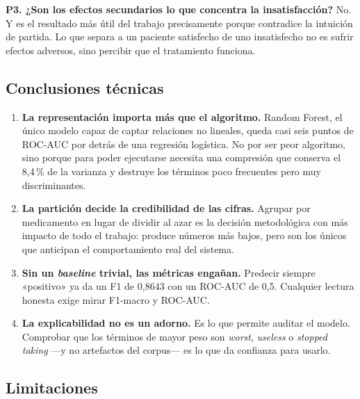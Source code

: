 \documentclass[11pt,a4paper]{article}
\begin{document}
\textbf{P3. ¿Son los efectos secundarios lo que concentra la insatisfacción?}
No. Y es el resultado más útil del trabajo precisamente porque contradice la
intuición de partida. Lo que separa a un paciente satisfecho de uno insatisfecho
no es sufrir efectos adversos, sino percibir que el tratamiento funciona.

\subsection{Conclusiones técnicas}

\begin{enumerate}[leftmargin=*]
  \item \textbf{La representación importa más que el algoritmo.} Random Forest,
        el único modelo capaz de captar relaciones no lineales, queda casi seis
        puntos de ROC-AUC por detrás de una regresión logística. No por ser peor
        algoritmo, sino porque para poder ejecutarse necesita una compresión que
        conserva el 8,4\,\% de la varianza y destruye los términos poco
        frecuentes pero muy discriminantes.
  \item \textbf{La partición decide la credibilidad de las cifras.} Agrupar por
        medicamento en lugar de dividir al azar es la decisión metodológica con
        más impacto de todo el trabajo: produce números más bajos, pero son los
        únicos que anticipan el comportamiento real del sistema.
  \item \textbf{Sin un \textit{baseline} trivial, las métricas engañan.}
        Predecir siempre «positivo» ya da un F1 de 0,8643 con un ROC-AUC de 0,5.
        Cualquier lectura honesta exige mirar F1-macro y ROC-AUC.
  \item \textbf{La explicabilidad no es un adorno.} Es lo que permite auditar el
        modelo. Comprobar que los términos de mayor peso son \textit{worst},
        \textit{useless} o \textit{stopped taking} —y no artefactos del corpus—
        es lo que da confianza para usarlo.
\end{enumerate}

\subsection{Limitaciones}
\end{document}

